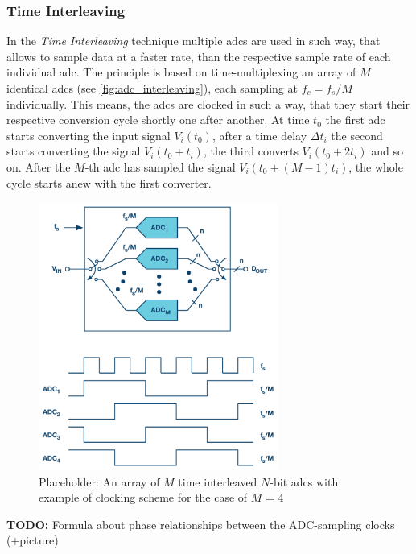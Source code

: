 \subsubsection*{Time Interleaving}\label{sssec:time-interleaving}
In the \textit{Time Interleaving} technique multiple \glspl{adc} are used in such way, that allows to sample data at a faster rate, than the respective sample rate of each individual \gls{adc}. The principle is based on time-multiplexing an array of $M$ identical \glspl{adc} (see \autoref{fig:adc_interleaving}), each sampling at $f_c = f_s/M$ individually. This means, the \glspl{adc} are clocked in such a way, that they start their respective conversion cycle shortly one after another. At time $t_0$ the first \gls{adc} starts converting the input signal $V_i(t_0)$, after a time delay $\Delta t_i$ the second starts converting the signal $V_i(t_0 + t_i)$, the third converts $V_i(t_0 + 2t_i)$ and so on. After the $M$-th \gls{adc} has sampled the signal $V_i(t_0 + (M-1)t_i)$, the whole cycle starts anew with the first converter. \cite{mangrob}
\begin{figure}[tbh]
	\centering
	\includegraphics[width = 0.7\textwidth]{chap/02-theory/img/adc_inter}
	\caption[Time Interleaving]{Placeholder: An array of $M$ time interleaved $N$-bit \glspl{adc} with example of clocking scheme for the case of $M$ = 4 \cite{mangrob}}
	\label{fig:adc_interleaving}
\end{figure}

\textbf{TODO:} Formula about phase relationships between the ADC-sampling clocks (+picture)

